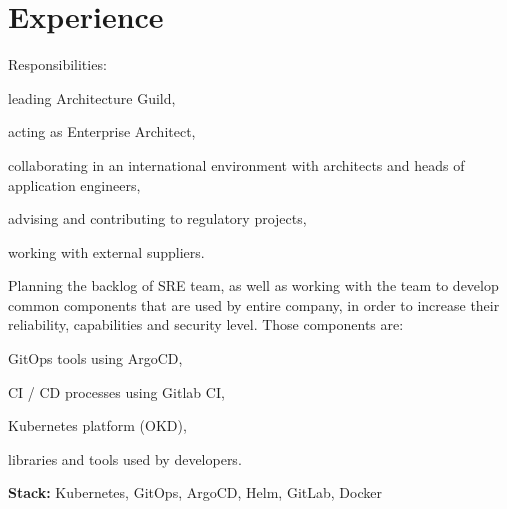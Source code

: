 \section{Experience}

Responsibilities:
\vspace{\topsep} %
\begin{tightemize}
\item leading Architecture Guild,
\item acting as Enterprise Architect,
\item collaborating in an international environment with architects and heads of application engineers,
\item advising and contributing to regulatory projects,
\item working with external suppliers.
\end{tightemize}
\sectionsep

Planning the backlog of SRE team, as well as working with the team to develop common components that 
are used by entire company, in order to increase their reliability, capabilities and security level. 
Those components are:
\vspace{\topsep} %
\begin{tightemize}
\item GitOps tools using ArgoCD,
\item CI / CD processes using Gitlab CI,
\item Kubernetes platform (OKD),
\item libraries and tools used by developers.
\end{tightemize}
\textbf{Stack:} Kubernetes, GitOps, ArgoCD, Helm, GitLab, Docker
\sectionsep

